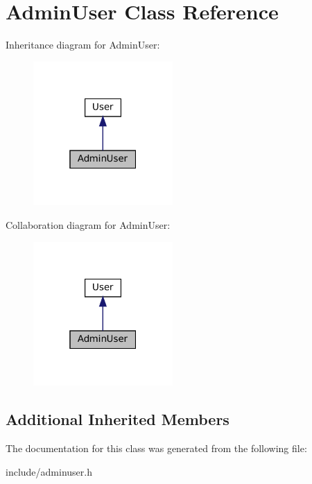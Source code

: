 \hypertarget{classAdminUser}{}\section{Admin\+User Class Reference}
\label{classAdminUser}


Inheritance diagram for Admin\+User\+:
\nopagebreak
\begin{figure}[H]
\begin{center}
\leavevmode
\includegraphics[width=151pt]{classAdminUser__inherit__graph}
\end{center}
\end{figure}


Collaboration diagram for Admin\+User\+:
\nopagebreak
\begin{figure}[H]
\begin{center}
\leavevmode
\includegraphics[width=151pt]{classAdminUser__coll__graph}
\end{center}
\end{figure}
\subsection*{Additional Inherited Members}


The documentation for this class was generated from the following file\+:\begin{DoxyCompactItemize}
\item 
include/adminuser.\+h\end{DoxyCompactItemize}

